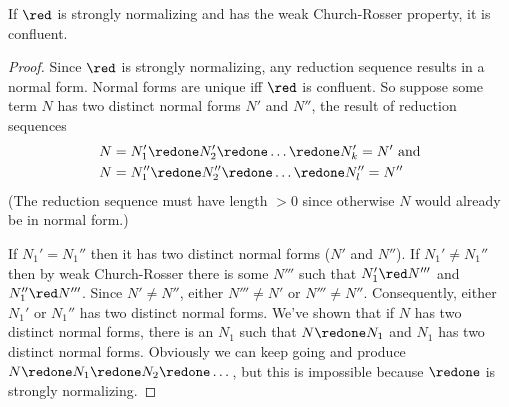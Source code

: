 \documentclass[../../../include/open-logic-section]{subfiles}
\begin{document}
\begin{lem}
If $\red$ is strongly normalizing and has the weak Church-Rosser
property, it is confluent.
\end{lem}

\begin{proof}
  Since $\red$ is strongly normalizing, any reduction sequence results
  in a normal form. Normal forms are unique iff $\red$ is confluent.
  So suppose some term $N$ has two distinct normal forms $N'$ and
  $N''$, the result of reduction sequences
  \begin{align*}
  N & = N_1' \redone N_2' \redone \dots \redone N_k' = N' \text{ and}\\
  N & = N_1'' \redone N_2'' \redone \dots \redone N_l'' = N''
  \end{align*}
  (The reduction sequence must have length $>0$ since otherwise $N$
  would already be in normal form.)

  If $N_1' = N_1''$ then it has two distinct normal forms ($N'$ and
  $N''$). If $N_1' \neq N_1''$ then by weak Church-Rosser there is
  some $N'''$ such that $N_1' \red N'''$ and $N_1'' \red N'''$. Since
  $N' \neq N''$, either $N''' \neq N'$ or $N''' \neq N''$.
  Consequently, either $N_1'$ or $N_1''$ has two distinct normal
  forms. We've shown that if $N$ has two distinct normal forms, there
  is an $N_1$ such that $N \redone N_1$ and $N_1$ has two distinct
  normal forms. Obviously we can keep going and produce $N \redone N_1
  \redone N_2 \redone \dots$, but this is impossible because $\redone$
  is strongly normalizing.
\end{proof}
\end{document}
